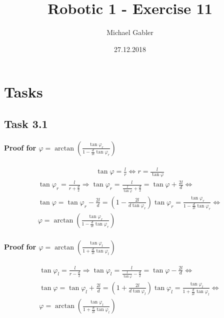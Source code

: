 \documentclass{article}
\begin{document}
	\author{Michael Gabler}
	\title{Robotic 1 - Exercise 11}
	\date{27.12.2018}
	\maketitle
	
	\newpage
	
	\tableofcontents
	
	\newpage
	
	\section{Tasks}
	\subsection{Task 3.1}
	\paragraph{Proof for $\varphi = \arctan(\frac{\tan \varphi_{r}}{1-\frac{d}{2l}\tan \varphi_{r}})$}
	
	\begin{gather}
	\tan \varphi = \frac{l}{r}
	\Leftrightarrow
	r = \frac{l}{\tan \varphi}
	\end{gather}
	\begin{gather}
	\nonumber \tan \varphi_{r} = \frac{l}{r + \frac{d}{2}} \Rightarrow 
	\tan \varphi_{r} = \frac{l}{\frac{l}{\tan \varphi} + \frac{d}{2}} = \tan \varphi + \frac{2l}{d}
	\Leftrightarrow\\
	\nonumber \tan \varphi = \tan \varphi_{r} - \frac{2l}{d} = (1 - \frac{2l}{d \tan \varphi_{r}}) \tan \varphi_{r} = \frac{\tan \varphi_{r}}{1 - \frac{d}{2l} \tan \varphi_{r}}
	\Leftrightarrow\\
	\varphi = \arctan(\frac{\tan \varphi_{r}}{1-\frac{d}{2l}\tan \varphi_{r}})
	\end{gather}
	
	\paragraph{Proof for $\varphi = \arctan(\frac{\tan \varphi_{l}}{1+\frac{d}{2l}\tan \varphi_{l}})$}
	
	\begin{gather}
	\nonumber \tan \varphi_{l} = \frac{l}{r - \frac{d}{2}} \Rightarrow 
	\tan \varphi_{l} = \frac{l}{\frac{l}{\tan \varphi} - \frac{d}{2}} = \tan \varphi - \frac{2l}{d}
	\Leftrightarrow\\
	\nonumber \tan \varphi = \tan \varphi_{l} + \frac{2l}{d} = (1 + \frac{2l}{d \tan \varphi_{l}}) \tan \varphi_{l} = \frac{\tan \varphi_{l}}{1 + \frac{d}{2l} \tan \varphi_{l}}
	\Leftrightarrow\\
	\varphi = \arctan(\frac{\tan \varphi_{l}}{1+\frac{d}{2l}\tan \varphi_{l}})
	\end{gather}
	
\end{document}
